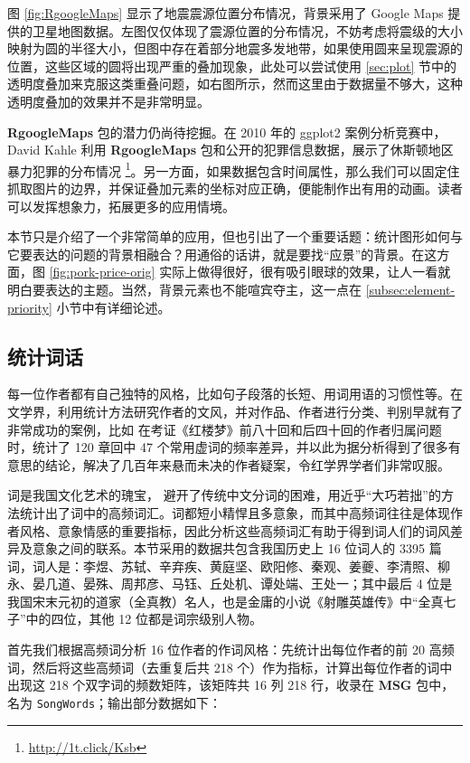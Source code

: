 \documentclass[
  b5paper,
  UTF8,twoside]{book}
\begin{document}
图 \ref{fig:RgoogleMaps} 显示了地震震源位置分布情况，背景采用了 Google Maps 提供的卫星地图数据。左图仅仅体现了震源位置的分布情况，不妨考虑将震级的大小映射为圆的半径大小，但图中存在着部分地震多发地带，如果使用圆来呈现震源的位置，这些区域的圆将出现严重的叠加现象，此处可以尝试使用 \ref{sec:plot} 节中的透明度叠加来克服这类重叠问题，如右图所示，然而这里由于数据量不够大，这种透明度叠加的效果并不是非常明显。

\textbf{RgoogleMaps} 包的潜力仍尚待挖掘。在 2010 年的 ggplot2 案例分析竞赛中，David Kahle 利用 \textbf{RgoogleMaps} 包和公开的犯罪信息数据，展示了休斯顿地区暴力犯罪的分布情况 \footnote{\url{http://1t.click/Ksb}}。另一方面，如果数据包含时间属性，那么我们可以固定住抓取图片的边界，并保证叠加元素的坐标对应正确，便能制作出有用的动画。读者可以发挥想象力，拓展更多的应用情境。

本节只是介绍了一个非常简单的应用，但也引出了一个重要话题：统计图形如何与它要表达的问题的背景相融合？用通俗的话讲，就是要找``应景''的背景。在这方面，图 \ref{fig:pork-price-orig} 实际上做得很好，很有吸引眼球的效果，让人一看就明白要表达的主题。当然，背景元素也不能喧宾夺主，这一点在 \ref{subsec:element-priority} 小节中有详细论述。

\subsection{统计词话}\label{subsec:cluster}

每一位作者都有自己独特的风格，比如句子段落的长短、用词用语的习惯性等。在文学界，利用统计方法研究作者的文风，并对作品、作者进行分类、判别早就有了非常成功的案例，比如 \citet{Li87} 在考证《红楼梦》前八十回和后四十回的作者归属问题时，统计了 120 章回中 47 个常用虚词的频率差异，并以此为据分析得到了很多有意思的结论，解决了几百年来悬而未决的作者疑案，令红学界学者们非常叹服。

词是我国文化艺术的瑰宝， \citet{Qiu11} 避开了传统中文分词的困难，用近乎``大巧若拙''的方法统计出了词中的高频词汇。词都短小精悍且多意象，而其中高频词往往是体现作者风格、意象情感的重要指标，因此分析这些高频词汇有助于得到词人们的词风差异及意象之间的联系。本节采用的数据共包含我国历史上 16 位词人的 3395 篇词，词人是：李煜、苏轼、辛弃疾、黄庭坚、欧阳修、秦观、姜夔、李清照、柳永、晏几道、晏殊、周邦彦、马钰、丘处机、谭处端、王处一；其中最后 4 位是我国宋末元初的道家（全真教）名人，也是金庸的小说《射雕英雄传》中``全真七子''中的四位，其他 12 位都是词宗级别人物。

首先我们根据高频词分析 16 位作者的作词风格：先统计出每位作者的前 20 高频词，然后将这些高频词（去重复后共 218 个）作为指标，计算出每位作者的词中出现这 218 个双字词的频数矩阵，该矩阵共 16 列 218 行，收录在 \textbf{MSG} 包中，名为 \texttt{SongWords}；输出部分数据如下：
\end{document}

